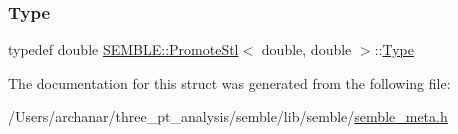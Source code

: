 \subsubsection{\texorpdfstring{Type}{Type}\hspace{0.1cm}{\footnotesize\ttfamily [2/2]}}
{\footnotesize\ttfamily typedef double \mbox{\hyperlink{structSEMBLE_1_1PromoteStl}{S\+E\+M\+B\+L\+E\+::\+Promote\+Stl}}$<$ double, double $>$\+::\mbox{\hyperlink{structSEMBLE_1_1PromoteStl_3_01double_00_01double_01_4_a09037ec720a5c55429c0ef2db9468631}{Type}}}



The documentation for this struct was generated from the following file\+:\begin{DoxyCompactItemize}
\item 
/\+Users/archanar/three\+\_\+pt\+\_\+analysis/semble/lib/semble/\mbox{\hyperlink{lib_2semble_2semble__meta_8h}{semble\+\_\+meta.\+h}}\end{DoxyCompactItemize}
